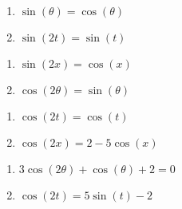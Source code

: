 \documentclass{ximera}
\begin{document}
\begin{multicols}{2}

\begin{enumerate}

\setcounter{enumi}{\value{HW}}

\item $\sin \left( \theta \right) = \cos \left( \theta \right)$ \label{solveidentfirst}
\item $\sin \left( 2t \right) = \sin \left( t \right)$

\setcounter{HW}{\value{enumi}}

\end{enumerate}

\end{multicols}

\begin{multicols}{2}

\begin{enumerate}

\setcounter{enumi}{\value{HW}}

\item $\sin \left( 2x \right) = \cos \left( x \right)$
\item $\cos \left( 2\theta \right) = \sin \left( \theta \right)$

\setcounter{HW}{\value{enumi}}

\end{enumerate}

\end{multicols}

\begin{multicols}{2}

\begin{enumerate}

\setcounter{enumi}{\value{HW}}

\item $\cos \left( 2t \right) = \cos \left( t \right)$
\item  $\cos(2x) = 2 - 5\cos(x)$

\setcounter{HW}{\value{enumi}}

\end{enumerate}

\end{multicols}

\begin{multicols}{2}

\begin{enumerate}

\setcounter{enumi}{\value{HW}}

\item  $3\cos(2 \theta ) + \cos(\theta) + 2 = 0$
\item  $\cos(2t) = 5\sin(t) - 2$

\setcounter{HW}{\value{enumi}}

\end{enumerate}

\end{multicols}
\end{document}
